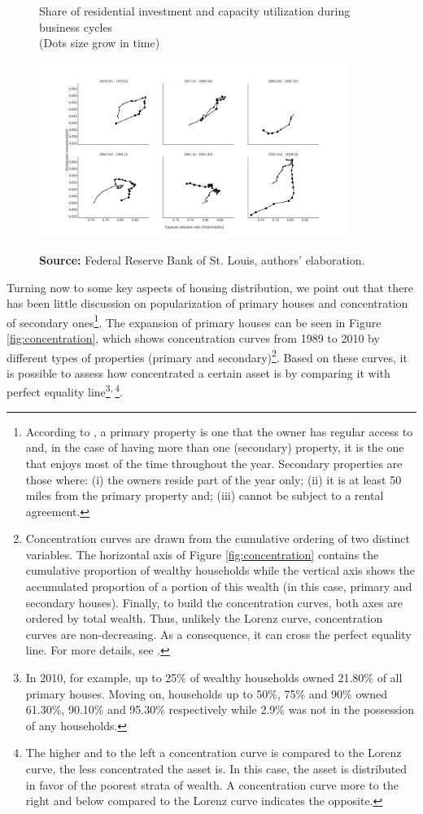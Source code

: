 \documentclass[11pt]{article}
\begin{document}
\begin{figure}[htb]
    \centering
        \caption{Share of residential investment and capacity utilization during business cycles\\\centering (Dots size grow in  time)} 
    \includegraphics[width = 0.9\textwidth]{./figs/cycles.png}
    \label{fig:cycles}
    \caption*{\textbf{Source:} Federal Reserve Bank of St. Louis, authors’ elaboration.}
\end{figure}
Turning now to some key aspects of housing distribution, we point out that  there has been little discussion on popularization of primary houses and concentration of secondary ones\footnote{According to \textcite{us_census_bureau_characteristics_2017}, a primary property is one that the owner has regular access to and, in the case of having more than one (secondary) property, it is the one that enjoys most of the time throughout the year. Secondary properties are those where:
(i) the owners reside part of the year only; (ii) it is at least 50 miles from the primary property and; (iii) cannot be subject to a rental agreement.}. The expansion of primary houses can be seen in Figure \ref{fig:concentration}, which shows concentration curves from 1989 to 2010 by different types of properties (primary and secondary)\footnote{Concentration curves are drawn from the cumulative ordering of two distinct variables. The horizontal axis of Figure \ref{fig:concentration} contains the cumulative proportion of wealthy households while the vertical axis shows the accumulated proportion of a portion of this wealth (in this case, primary and secondary houses). Finally, to build the concentration curves, both axes are ordered by total wealth. Thus, unlikely the Lorenz curve, concentration curves are non-decreasing. As a consequence, it can cross the perfect equality line. For more details, see \textcite{Jann_Concentration_2016}.}. Based on these curves, it is possible to assess how concentrated a certain asset is by comparing it with perfect equality line\footnote{In 2010, for example,  up to 25\% of wealthy households owned 21.80\% of all primary houses. Moving on, households up to 50\%, 75\% and 90\% owned 61.30\%, 90.10\% and  95.30\% respectively while 2.9\% was not in the possession of any households.}\textsuperscript{,}\,\footnote{The higher and to the left a concentration curve is compared to the Lorenz curve, the less concentrated the asset is. In this case, the asset  is distributed in favor of the poorest strata of wealth. A concentration curve more to the right and below compared to the Lorenz curve indicates the opposite.}.
\end{document}
